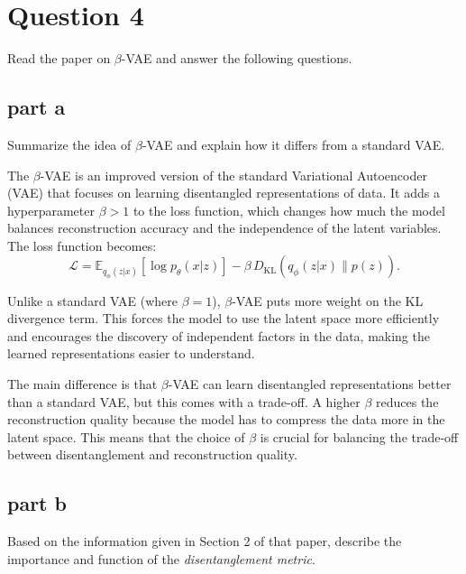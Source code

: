 \section{Question 4}

Read the paper on \(\beta\)-VAE and answer the following questions.
\subsection{part a}
Summarize the idea of \(\beta\)-VAE and explain how it differs from a standard VAE.

\begin{qsolve}
    \begin{qsolve}[]
      The \(\beta\)-VAE is an improved version of the standard Variational Autoencoder (VAE) that focuses on learning disentangled representations of data. It adds a hyperparameter \(\beta > 1\) to the loss function, which changes how much the model balances reconstruction accuracy and the independence of the latent variables. The loss function becomes:
      \[
      \mathcal{L} = \mathbb{E}_{q_{\phi}(z|x)}[\log p_{\theta}(x|z)] - \beta \, D_{\mathrm{KL}}(q_{\phi}(z|x) \| p(z)).
      \]

      Unlike a standard VAE (where \(\beta = 1\)), \(\beta\)-VAE puts more weight on the KL divergence term. This forces the model to use the latent space more efficiently and encourages the discovery of independent factors in the data, making the learned representations easier to understand.

      The main difference is that \(\beta\)-VAE can learn disentangled representations better than a standard VAE, but this comes with a trade-off. A higher \(\beta\) reduces the reconstruction quality because the model has to compress the data more in the latent space. This means that the choice of \(\beta\) is crucial for balancing the trade-off between disentanglement and reconstruction quality.      
    \end{qsolve}
\end{qsolve}

\subsection{part b}
Based on the information given in Section 2 of that paper, describe the importance and function of the \emph{disentanglement metric}.

